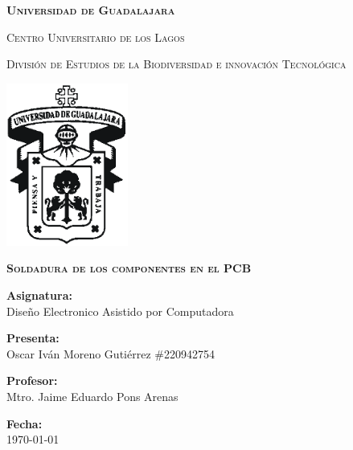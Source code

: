\documentclass[12pt]{report}
\begin{document}
\setlength{\hoffset}{27 pt} %
\begin{titlepage}
{\centering
{\scshape\bfseries\fontsize{29.16}{34.992}\selectfont Universidad de Guadalajara \par}
\vspace{0.5cm}
{\scshape\Large Centro Universitario de los Lagos \par}
\vspace{1cm}
{\scshape\Large División de Estudios de la Biodiversidad e innovación Tecnológica \par}
\vspace{1cm}
{\graphicspath{{imagenes/Portada}} %
\includegraphics[width=0.3\textwidth]{image.png}\par}
\vspace{1cm}
{\scshape\large\bfseries Soldadura de los componentes en el PCB \par}
\vspace{1.5cm}
{\large \textbf{Asignatura:} \\Diseño Electronico Asistido por Computadora\par}
\vfill
{\large \textbf{Presenta:} \\Oscar Iván Moreno Gutiérrez \#220942754\par}
\vfill
{\large \textbf{Profesor:} \\Mtro. Jaime Eduardo Pons Arenas \par}
\vfill
\vfill
\begin{flushright}
  {\normalsize \textbf {Fecha:} \\ \today}
\end{flushright}
\vfill}
{\large  \par}
\end{titlepage}

\tableofcontents
\newpage
\end{document}
